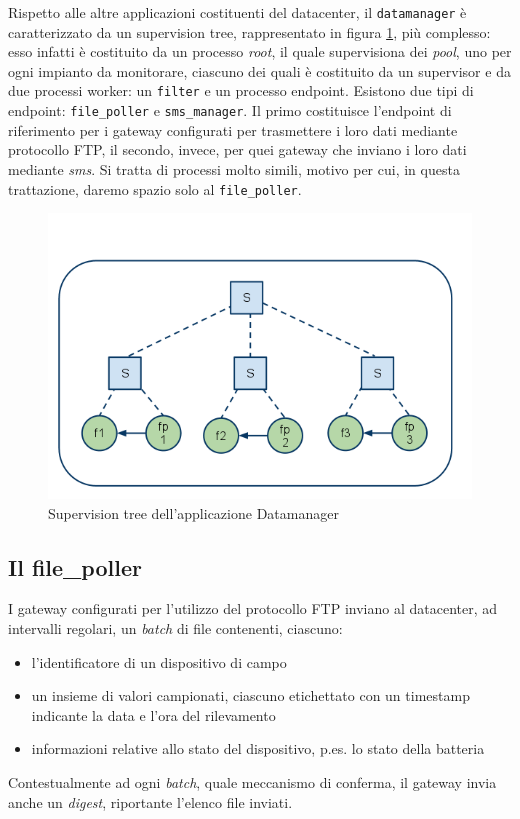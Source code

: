 %
Rispetto alle altre applicazioni costituenti del datacenter, il \texttt{datamanager} \`e 
caratterizzato da un supervision tree, rappresentato in figura \ref{datamanagersuptree},
pi\`u complesso: esso infatti \`e costituito da un processo \emph{root}, il quale supervisiona
dei \emph{pool}, uno per ogni impianto da monitorare, ciascuno dei quali \`e costituito da un 
supervisor e da due processi worker: un \texttt{filter} e un processo endpoint.
%
Esistono due tipi di endpoint: \texttt{file\_poller} e \texttt{sms\_manager}. Il primo costituisce
l'endpoint di riferimento per i gateway configurati per trasmettere i loro dati mediante 
protocollo FTP, il secondo, invece, per quei gateway che inviano i loro dati mediante \emph{sms}.
%
Si tratta di processi molto simili, motivo per cui, in questa trattazione, daremo spazio solo al
\texttt{file\_poller}.
%

%
\begin{figure}[!h]
\centering
\includegraphics[width=380pt]{img/datamanager.png}
\caption{Supervision tree dell'applicazione Datamanager}
\label{datamanagersuptree}
\end{figure}
%

%
\subsection{Il file\_poller}
I gateway configurati per l'utilizzo del protocollo FTP inviano al datacenter, 
ad intervalli regolari, un \emph{batch} di file contenenti, ciascuno:
%
\begin{itemize}
\item l'identificatore di un dispositivo di campo
\item un insieme di valori campionati, ciascuno etichettato con un 
      timestamp indicante la data e l'ora del rilevamento
\item informazioni relative allo stato del dispositivo, 
      p.es. lo stato della batteria
\end{itemize}
%
Contestualmente ad ogni \emph{batch}, quale meccanismo di conferma, il gateway invia anche un 
\emph{digest}, riportante l'elenco file inviati.
%


